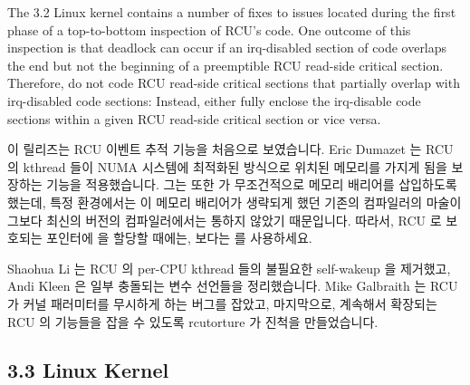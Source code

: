 The 3.2 Linux kernel contains a number of fixes to issues located
during the first phase of a top-to-bottom inspection of RCU's code.
One outcome of this inspection is that deadlock can occur if
an irq-disabled section of code overlaps the end but not the beginning
of a preemptible RCU read-side critical section.
Therefore, do not code RCU read-side critical sections that partially
overlap with irq-disabled code sections:
Instead, either fully enclose the irq-disable code sections within a
given RCU read-side critical section or vice versa.
\fi

이 릴리즈는 RCU 이벤트 추적 기능을 처음으로 보였습니다.
Eric Dumazet 는 RCU 의 kthread 들이 NUMA 시스템에 최적화된 방식으로 위치된
메모리를 가지게 됨을 보장하는  기능을
적용했습니다.
그는 또한  가 무조건적으로 메모리 배리어를 삽입하도록
했는데, 특정 환경에서는 이 메모리 배리어가 생략되게 했던 기존의 컴파일러의
마술이 그보다 최신의 버전의 컴파일러에서는 통하지 않았기 때문입니다.
따라서, RCU 로 보호되는 포인터에  을 할당할 때에는,
 보다는  를 사용하세요.

Shaohua Li 는 RCU 의 per-CPU kthread 들의 불필요한 self-wakeup 을 제거했고,
Andi Kleen 은 일부 충돌되는 변수 선언들을 정리했습니다.
Mike Galbraith 는 RCU 가  커널 패러미터를 무시하게 하는
버그를 잡았고, 마지막으로, 계속해서 확장되는 RCU 의 기능들을 잡을 수 있도록
rcutorture 가 진척을 만들었습니다.

\subsection{3.3 Linux Kernel}

